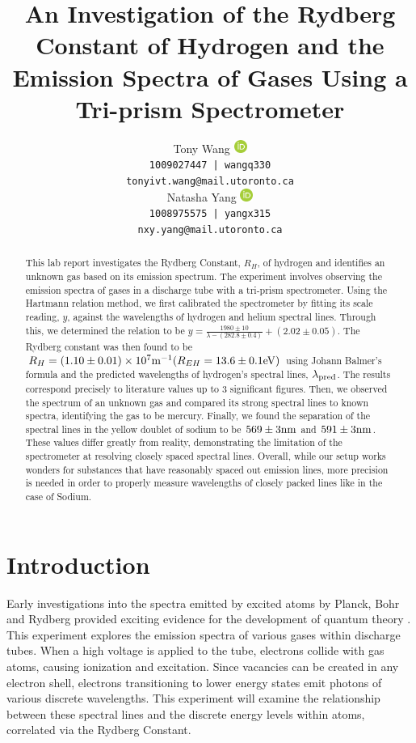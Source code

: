 \documentclass[12pt]{article}
\title{An Investigation of the Rydberg Constant of Hydrogen and the Emission Spectra of Gases Using a Tri-prism Spectrometer}
\author{
Tony Wang \href{https://orcid.org/0009-0009-3015-7192}{\includegraphics[height=12pt]{figure/orcid.png}}\\
\texttt{1009027447 | wangq330} \\
\texttt{tonyivt.wang@mail.utoronto.ca}\\
\And
Natasha Yang \href{https://orcid.org/12345}{\includegraphics[height=12pt]{figure/orcid.png}}\\
\texttt{1008975575 | yangx315} \\
\texttt{nxy.yang@mail.utoronto.ca} \\
}
\begin{document}
\maketitle
\begin{abstract}
    This lab report investigates the Rydberg Constant, $R_H$, of hydrogen and identifies an unknown gas based on its emission spectrum. The experiment involves observing the emission spectra of gases in a discharge tube with a tri-prism spectrometer. Using the Hartmann relation method, we first calibrated the spectrometer by fitting its scale reading, $y$, against the wavelengths of hydrogen and helium spectral lines. Through this, we determined the relation to be $y=\frac{1980 \pm 10}{\lambda - (282.8 \pm 0.4)} + (2.02 \pm 0.05)$. The Rydberg constant was then found to be $R_{H} = (1.10 \pm 0.01) \times 10^7 {\rm  m}^{-1} (R_{EH} = 13.6 \pm 0.1 {\rm eV})$ using Johann Balmer's formula and the predicted wavelengths of hydrogen's spectral lines, $\lambda_{\rm pred}$. The results correspond precisely to literature values up to 3 significant figures. Then, we observed the spectrum of an unknown gas and compared its strong spectral lines to known spectra, identifying the gas to be mercury. Finally, we found the separation of the spectral lines in the yellow doublet of sodium to be $569 \pm 3 {\rm  nm}$ and $591 \pm 3 {\rm nm}$. These values differ greatly from reality, demonstrating the limitation of the spectrometer at resolving closely spaced spectral lines. Overall, while our setup works wonders for substances that have reasonably spaced out emission lines, more precision is needed in order to properly measure wavelengths of closely packed lines like in the case of Sodium.
    
\end{abstract}

\section{Introduction}
Early investigations into the spectra emitted by excited atoms by Planck, Bohr and Rydberg provided exciting evidence for the development of quantum theory \autocite{PhysRevA.34.5138}. This experiment explores the emission spectra of various gases within discharge tubes. When a high voltage is applied to the tube, electrons collide with gas atoms, causing ionization and excitation. Since vacancies can be created in any electron shell, electrons transitioning to lower energy states emit photons of various discrete wavelengths. This experiment will examine the relationship between these spectral lines and the discrete energy levels within atoms, correlated via the Rydberg Constant.
\end{document}
